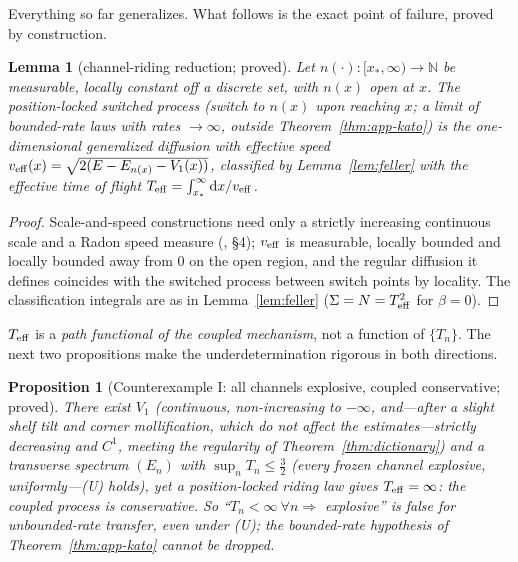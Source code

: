 \documentclass[11pt]{article}
\newtheorem{lemma}[theorem]{Lemma}
\newtheorem{proposition}[theorem]{Proposition}
\theoremstyle{definition}
\theoremstyle{remark}
\newcommand{\dd}{\mathrm{d}}
\begin{document}
Everything so far generalizes. What follows is the exact point of
failure, proved by construction.

\begin{lemma}[channel-riding reduction; proved]\label{lem:app-riding}
Let $n(\cdot):[x_{*},\infty)\to\mathbb N$ be measurable, locally
constant off a discrete set, with $n(x)$ open at $x$. The
\emph{position-locked} switched process (switch to $n(x)$ upon reaching
$x$; a limit of bounded-rate laws with rates $\to\infty$, \emph{outside}
Theorem~\ref{thm:app-kato}) is the one-dimensional generalized
diffusion with effective speed
$v_{\rm eff}(x)=\sqrt{2(E-E_{n(x)}-V_{1}(x))}$, classified by
Lemma~\ref{lem:feller} with the \emph{effective time of flight}
$T_{\rm eff}=\int_{x_{*}}^{\infty}\dd x/v_{\rm eff}$.
\end{lemma}

\begin{proof}
Scale-and-speed constructions need only a strictly increasing
continuous scale and a Radon speed measure (\cite{ItoMcKean}, \S4);
$v_{\rm eff}$ is measurable, locally bounded and locally bounded away
from $0$ on the open region, and the regular diffusion it defines
coincides with the switched process between switch points by locality.
The classification integrals are as in Lemma~\ref{lem:feller}
($\Sigma=N=T_{\rm eff}^{2}$ for $\beta=0$).
\end{proof}

$T_{\rm eff}$ is a \emph{path functional of the coupled mechanism}, not
a function of $\{T_{n}\}$. The next two propositions make the
underdetermination rigorous in both directions.

\begin{proposition}[Counterexample I: all channels explosive, coupled
conservative; proved]\label{prop:app-ce1}
There exist $V_{1}$ (continuous, non-increasing to $-\infty$, and---after a
slight shelf tilt and corner mollification, which do not affect the
estimates---strictly decreasing and $C^{1}$, meeting the regularity of
Theorem~\ref{thm:dictionary}) and a
transverse spectrum $(E_{n})$ with $\sup_{n}T_{n}\le\tfrac32$ (every
frozen channel explosive, uniformly---(U) holds), yet a position-locked
riding law gives $T_{\rm eff}=\infty$: the coupled process is
\emph{conservative}. So ``$T_{n}<\infty\ \forall n\Rightarrow$
explosive'' is \emph{false} for unbounded-rate transfer, even under
(U); the bounded-rate hypothesis of Theorem~\ref{thm:app-kato} cannot
be dropped.
\end{proposition}
\end{document}
